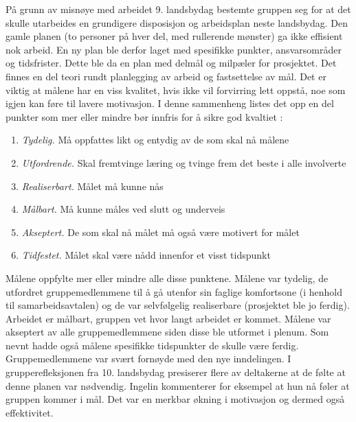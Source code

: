 På grunn av misnøye med arbeidet 9. landsbydag bestemte gruppen seg for at det skulle utarbeides en grundigere disposisjon og arbeidsplan neste landsbydag.
Den gamle planen (to personer på hver del, med rullerende mønster) ga ikke effisient nok arbeid.
En ny plan ble derfor laget med spesifikke punkter, ansvarsområder og tidsfrister.
Dette ble da en plan med delmål og milpæler for prosjektet.
Det finnes en del teori rundt planlegging av arbeid og fastsettelse av mål.
Det er viktig at målene har en viss kvalitet, hvis ikke vil forvirring lett oppstå, noe som igjen kan føre til lavere motivasjon.
I denne sammenheng listes det opp en del punkter som mer eller mindre bør innfris for å sikre god kvaltiet \cite{prosjekteringsledelse}:
\begin{enumerate}
\item \textit{Tydelig.} Må oppfattes likt og entydig av de som skal nå målene
\item \textit{Utfordrende.} Skal fremtvinge læring og tvinge frem det beste i alle involverte
\item \textit{Realiserbart.} Målet må kunne nås
\item \textit{Målbart.} Må kunne måles ved slutt og underveis
\item \textit{Akseptert.} De som skal nå målet må også være motivert for målet
\item \textit{Tidfestet.} Målet skal være nådd innenfor et visst tidspunkt
\end{enumerate}
Målene oppfylte mer eller mindre alle disse punktene.
Målene var tydelig, de utfordret gruppemedlemmene til å gå utenfor sin faglige komfortsone (i henhold til samarbeidsavtalen) og de var selvfølgelig realiserbare (prosjektet ble jo ferdig).
Arbeidet er målbart, gruppen vet hvor langt arbeidet er kommet.
Målene var akseptert av alle gruppemedlemmene siden disse ble utformet i plenum.
Som nevnt hadde også målene spesifikke tidspunkter de skulle være ferdig.\\

Gruppemedlemmene var svært fornøyde med den nye inndelingen.
I grupperefleksjonen fra 10. landsbydag presiserer flere av deltakerne at de følte at denne planen var nødvendig.
Ingelin kommenterer for eksempel at hun nå føler at gruppen kommer i mål.
Det var en merkbar økning i motivasjon og dermed også effektivitet.\\

